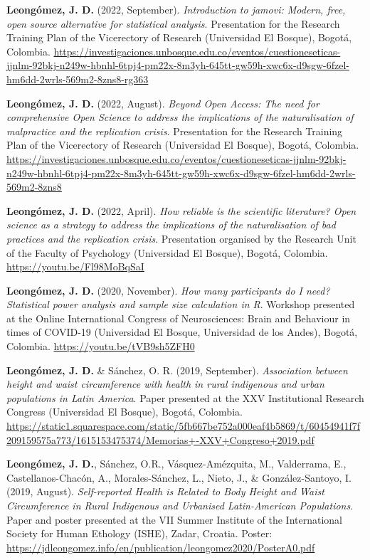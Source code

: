 \documentclass[11pt,a4paper,]{awesome-cv}
\begin{document}
\textbf{Leongómez, J. D.} (2022, September). \emph{Introduction to
jamovi: Modern, free, open source alternative for statistical analysis}.
Presentation for the Research Training Plan of the Vicerectory of
Research (Universidad El Bosque), Bogotá, Colombia.
\url{https://investigaciones.unbosque.edu.co/eventos/cuestioneseticas-jjnlm-92bkj-n249w-hbnhl-6tpj4-pm22x-8m3yh-645tt-gw59h-xwc6x-d9sgw-6fzel-hm6dd-2wrls-569m2-8zns8-rg363}

\textbf{Leongómez, J. D.} (2022, August). \emph{Beyond Open Access: The
need for comprehensive Open Science to address the implications of the
naturalisation of malpractice and the replication crisis}. Presentation
for the Research Training Plan of the Vicerectory of Research
(Universidad El Bosque), Bogotá, Colombia.
\url{https://investigaciones.unbosque.edu.co/eventos/cuestioneseticas-jjnlm-92bkj-n249w-hbnhl-6tpj4-pm22x-8m3yh-645tt-gw59h-xwc6x-d9sgw-6fzel-hm6dd-2wrls-569m2-8zns8}

\textbf{Leongómez, J. D.} (2022, April). \emph{How reliable is the
scientific literature? Open science as a strategy to address the
implications of the naturalisation of bad practices and the replication
crisis}. Presentation organised by the Research Unit of the Faculty of
Psychology (Universidad El Bosque), Bogotá, Colombia.
\url{https://youtu.be/Fl98MoBqSaI}

\textbf{Leongómez, J. D.} (2020, November). \emph{How many participants
do I need? Statistical power analysis and sample size calculation in R}.
Workshop presented at the Online International Congress of
Neurosciences: Brain and Behaviour in times of COVID-19 (Universidad El
Bosque, Universidad de los Andes), Bogotá, Colombia.
\url{https://youtu.be/tVB9sh5ZFH0}

\textbf{Leongómez, J. D.} \& Sánchez, O. R. (2019, September).
\emph{Association between height and waist circumference with health in
rural indigenous and urban populations in Latin America}. Paper
presented at the XXV Institutional Research Congress (Universidad El
Bosque), Bogotá, Colombia.
\url{https://static1.squarespace.com/static/5fb667be752a000eaf4b5869/t/60454941f7f209159575a773/1615153475374/Memorias+-XXV+Congreso+2019.pdf}

\textbf{Leongómez, J. D.}, Sánchez, O.R., Vásquez-Amézquita, M.,
Valderrama, E., Castellanos-Chacón, A., Morales-Sánchez, L., Nieto, J.,
\& González-Santoyo, I. (2019, August). \emph{Self-reported Health is
Related to Body Height and Waist Circumference in Rural Indigenous and
Urbanised Latin-American Populations}. Paper and poster presented at the
VII Summer Institute of the International Society for Human Ethology
(ISHE), Zadar, Croatia. Poster:
\url{https://jdleongomez.info/en/publication/leongomez2020/PosterA0.pdf}
\end{document}
